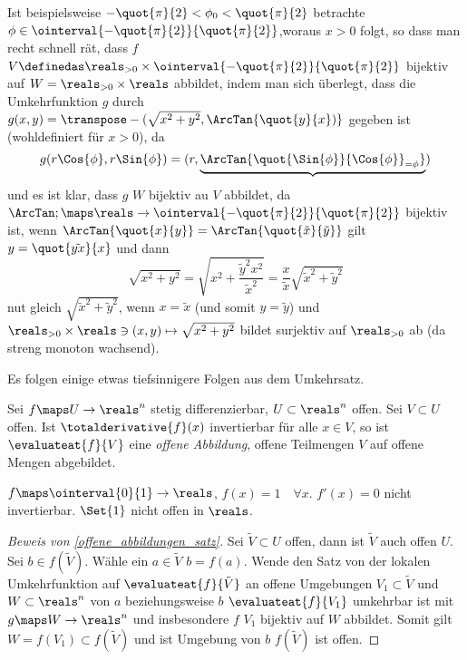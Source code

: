 \begin{beispiele}
\begin{enumerate}
\begin{beachte*}
      Ist beispielsweise \( -\quot{\pi}{2}<\phi_0<\quot{\pi}{2} \) betrachte \( \phi\in \ointerval{-\quot{\pi}{2}}{\quot{\pi}{2}} \),woraus \( x>0 \) folgt, so dass man recht schnell rät, dass \( f \) \( V\definedas \reals_{>0}\times  \ointerval{-\quot{\pi}{2}}{\quot{\pi}{2}} \) bijektiv auf \( W=\reals_{>0}\times \reals \) abbildet, indem man sich überlegt, dass die Umkehrfunktion \( g \) durch \( g(x,y)=\transpose-{(\sqrt{x^2+y^2}, \ArcTan{\quot{y}{x})}} \) gegeben ist (wohldefiniert für \( x>0 \)), da 
      \begin{equation*}
        g(r \Cos{\phi}, r\Sin{\phi})=(r,\underbrace{\ArcTan{\quot{\Sin{\phi}}{\Cos{\phi}}_{=\phi}}})
      \end{equation*}
      und es ist klar, dass \( g \) \( W \) bijektiv au \( V \) abbildet, da \( \ArcTan;\maps \reals\to \ointerval{-\quot{\pi}{2}}{\quot{\pi}{2}} \) bijektiv ist, \sd  wenn \( \ArcTan{\quot{x}{y}}=\ArcTan{\quot{\tilde{x}}{\tilde{y}}} \) gilt \( y=\quot{\tilde{yx}}{x} \) und dann
      \begin{equation*}
        \sqrt{x^2+y^2}=\sqrt{x^2+\frac{\tilde{y}^2 x^2}{\tilde{x}^2}}=\frac{x}{\tilde{x}}\sqrt{\tilde{x}^2+\tilde{y}^2}
      \end{equation*}
      nut gleich \( \sqrt{\tilde{x}^2+\tilde{y}^2} \), wenn \( x=\tilde{x} \) (und somit \( y= \tilde{y}\)) und \( \reals_{>0}\times\reals\ni (x,y)\mapsto \sqrt{x^2+y^2} \) bildet surjektiv auf \( \reals_{>0} \) ab (da streng monoton wachsend).
    \end{beachte*}
  \end{enumerate}
\end{beispiele}
Es folgen einige etwas tiefsinnigere Folgen aus dem Umkehrsatz.
\begin{satz}\label{offene_abbildungen_satz}
  Sei \( f\maps U\to \reals^n \) stetig differenzierbar, \( U\subset \reals^n \) offen. Sei \( V\subset U \) offen. Ist \( \totalderivative{f}(x) \) invertierbar für alle \( x\in V \), so ist \( \evaluateat{f}{V} \) eine \emph{offene Abbildung}, \dh offene Teilmengen \tsubset \( V \) auf offene Mengen abgebildet.
\end{satz}
\begin{antibeispiel*}
  \( f\maps \ointerval{0}{1}\to \reals \), \( f(x)=1\quad \forall x \). \( f'(x)=0 \) nicht invertierbar. \( \Set{1} \) nicht offen in \( \reals \).
\end{antibeispiel*}
\begin{proof}[Beweis von \ref{offene_abbildungen_satz}]
  Sei \( \tilde{V}\subset U \) offen, dann ist \( \tilde{V}  \) auch offen \( U \). Sei \( b\in f(\tilde{V}) \). Wähle ein \( a\in \tilde{V} \) \sd \( b=f(a) \). Wende den Satz von der lokalen Umkehrfunktion auf \( \evaluateat{f}{\tilde{V}} \) an \timplies \texists  offene Umgebungen \( V_1\subset \tilde{V} \) und \( W\subset \reals^n \) von \( a \) beziehungsweise \( b \) \sd \( \evaluateat{f}{V_1} \) umkehrbar ist mit \( g\maps W\to \reals^n \) und insbesondere \( f \) \( V_1 \) bijektiv auf \( W \) abbildet. Somit gilt \( W=f(V_1)\subset f(\tilde{V}) \) und ist Umgebung von \( b \) \timplies \( f(\tilde{V}) \) ist offen.
\end{proof}
